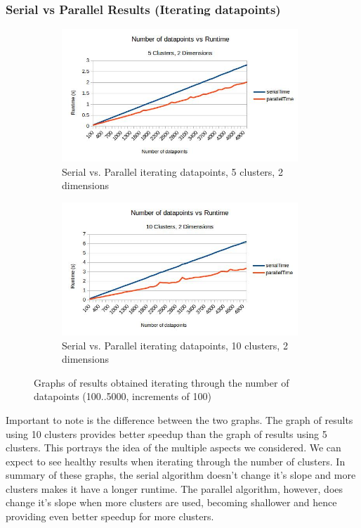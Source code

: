 \documentclass{article}
\begin{document}
\subsubsection{Serial vs Parallel Results (Iterating datapoints)}
\begin{figure}[h!]
    \begin{subfigure}{0.5\textwidth}
        \includegraphics[width=0.9\linewidth, height=5cm]{Pictures/datapoints1.jpg}
        \caption{Serial vs. Parallel iterating datapoints, 5 clusters, 2 dimensions}
    \end{subfigure}
    \begin{subfigure}{0.5\textwidth}
        \includegraphics[width=0.9\linewidth, height=5cm]{Pictures/datapoints2.jpg}
        \caption{Serial vs. Parallel iterating datapoints, 10 clusters, 2 dimensions}
    \end{subfigure}
\caption{Graphs of results obtained iterating through the number of datapoints (100..5000, increments of 100)}
\end{figure}

Important to note is the difference between the two graphs. The graph of results using 10 clusters provides better speedup than the graph of results using 5 clusters. This portrays the idea of the multiple aspects we considered. We can expect to see healthy results when iterating through the number of clusters. In summary of these graphs, the serial algorithm doesn't change it's slope and more clusters makes it have a longer runtime. The parallel algorithm, however, does change it's slope when more clusters are used, becoming shallower and hence providing even better speedup for more clusters.
\end{document}
